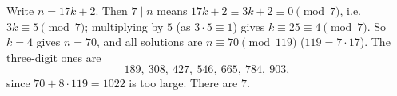 Write $n=17k+2$. Then $7\mid n$ means $17k+2\equiv3k+2\equiv0\pmod7$, i.e.\ $3k\equiv5\pmod7$; multiplying by $5$ (as $3\cdot5\equiv1$) gives $k\equiv25\equiv4\pmod7$. So $k=4$ gives $n=70$, and all solutions are $n\equiv70\pmod{119}$ ($119=7\cdot17$). The three-digit ones are
\[
189,\ 308,\ 427,\ 546,\ 665,\ 784,\ 903,
\]
since $70+8\cdot119=1022$ is too large. There are $\boxed{7}$.
